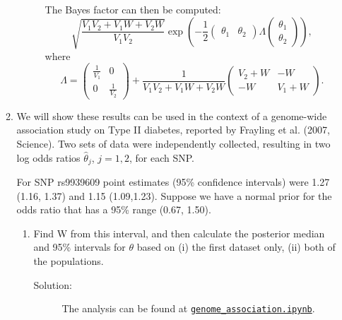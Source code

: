 \documentclass[letterpaper,11pt]{article}
\begin{document}
\begin{enumerate}
\begin{enumerate}
\begin{description}
      The Bayes factor can then be computed:
      \begin{equation}
        \sqrt{\frac{V_1V_2 + V_1W + V_2W}{V_1V_2}}
        \exp\left(
          -\frac{1}{2}
          \begin{pmatrix}
            \theta_1 & \theta_2
          \end{pmatrix}
          \Lambda
          \begin{pmatrix}
            \theta_1 \\ \theta_2
          \end{pmatrix}
        \right),
      \end{equation}
      where \begin{equation}
        \Lambda =
        \begin{pmatrix}
          \frac{1}{V_1} & 0 \\
          0 & \frac{1}{V_2}
        \end{pmatrix}
        + \frac{1}{V_1V_2 + V_1W + V_2W}
        \begin{pmatrix}
          V_2 + W & -W \\
          -W & V_1 + W
        \end{pmatrix}.
      \end{equation}
    \end{description}
  \item We will show these results can be used in the context of a genome-wide
    association study on Type II diabetes, reported by Frayling et al. (2007,
    Science). Two sets of data were independently collected, resulting in two
    log odds ratios $\hat{\theta}_j$, $j = 1,2$, for each SNP.
     
    For SNP rs9939609 point estimates (95\% confidence intervals) were 1.27
    (1.16, 1.37) and 1.15 (1.09,1.23). Suppose we have a normal prior for the
    odds ratio that has a 95\% range (0.67, 1.50).

    \begin{enumerate}
    \item Find W from this interval, and then calculate the posterior median and
      95\% intervals for $\theta$ based on (i) the first dataset only, (ii) both
      of the populations.
      \begin{description}
      \item[Solution:] The analysis can be found at
        \href{https://nbviewer.jupyter.org/github/ppham27/stat570/blob/master/hw5/genome\_association.ipynb}{\texttt{genome\_association.ipynb}}.
      \end{description}
      

\end{enumerate}
\end{enumerate}
\end{enumerate}
\end{document}
